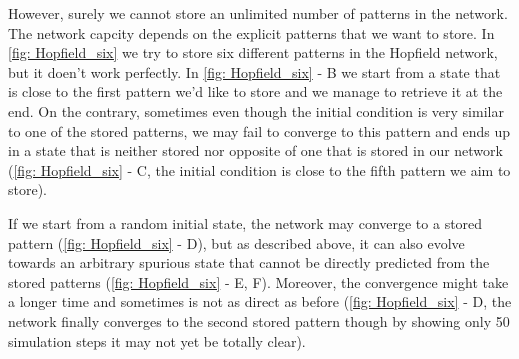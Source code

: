 However, surely we cannot store an unlimited number of patterns in the 
network. The network capcity depends on the explicit patterns that we want
to store. In \autoref{fig: Hopfield_six} we try to store six different 
patterns in the Hopfield network, but it doen't work perfectly.
In \autoref{fig: Hopfield_six} - \textsf{B} we start from a state that is
close to the first pattern we'd like to store and we manage to retrieve it
at the end. On the contrary, sometimes even though the initial condition 
is very similar to one of the stored patterns, we may fail to converge to 
this pattern and ends up in a state that is neither stored nor opposite of 
one that is stored in our network (\autoref{fig: Hopfield_six} -
\textsf{C}, the initial condition is close to the fifth pattern we aim to
store).

If we start from a random initial state, the network may converge to
a stored pattern (\autoref{fig: Hopfield_six} - \textsf{D}), but as
described above, it can also evolve towards an arbitrary spurious state
that cannot be directly predicted from the stored patterns
(\autoref{fig: Hopfield_six} - \textsf{E, F}). Moreover, the convergence
might take a longer time and sometimes is not as direct as before 
(\autoref{fig: Hopfield_six} - \textsf{D}, the network finally converges
to the second stored pattern though by showing only 50 simulation steps it may 
not yet be totally clear).


